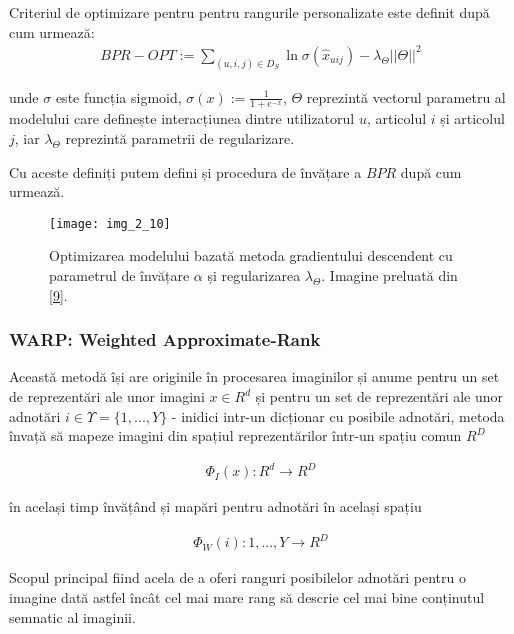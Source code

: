 Criteriul de optimizare pentru pentru rangurile personalizate este definit după cum urmează:
\begin{align}
	BPR-OPT := \sum_{(u,i,j) \in D_S} \ln{\sigma(\hat{x}_{uij})} - \lambda_\Theta||\Theta||^2
\end{align}

unde $\sigma$ este funcția sigmoid, $\sigma(x) := \frac{1}{1+e^{-x}}$, $\Theta$ reprezintă vectorul parametru al modelului care definește interacțiunea dintre utilizatorul $u$, articolul $i$ și articolul $j$, iar $\lambda_\Theta$ reprezintă parametrii de regularizare.

\vspace{5mm}
Cu aceste definiți putem defini și procedura de învățare a $BPR$ după cum urmează.

\begin{figure}[!h]
	\centering
	\texttt{[image: img\_2\_10]}
	\caption[Procedura de învățarea BPR]{Optimizarea modelului bazată metoda gradientului descendent cu parametrul de învățare $\alpha$ și regularizarea $\lambda_\Theta$. Imagine preluată din \hyperlink{SteffenRendleChristophFreudenthalerZenoGantnerLarsSchmidtThieme}{[9]}.}
\end{figure}

\vspace{5mm}
\subsubsection*{WARP: Weighted Approximate-Rank}

Această metodă își are originile în procesarea imaginilor și anume pentru un set de reprezentări ale unor imagini $x \in R^d$ și pentru un set de reprezentări ale unor adnotări $i \in \Upsilon = \{1, ..., Y\}$ - inidici intr-un dicționar cu posibile adnotări, metoda învață să mapeze imagini din spațiul reprezentărilor într-un spațiu comun $R^D$

\begin{align}
	\Phi_{I}(x):R^d \rightarrow R^D
\end{align}

în același timp învățând și mapări pentru adnotări în același spațiu

\begin{align}
	\Phi_{W}(i):{1,...,Y} \rightarrow R^D
\end{align}

Scopul principal fiind acela de a oferi ranguri posibilelor adnotări pentru o imagine dată astfel încât cel mai mare rang să descrie cel mai bine conținutul semnatic al imaginii. 

